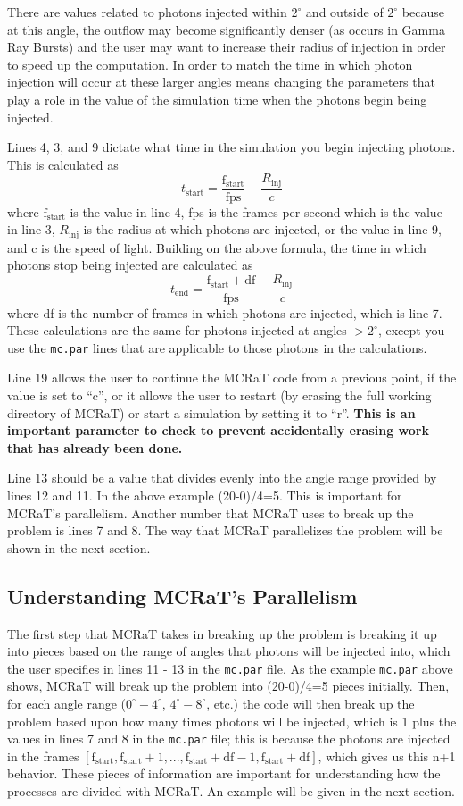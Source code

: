 \documentclass[12pt,a4paper]{article}
\begin{document}
There are values related to photons injected within $2^\circ$ and outside of $2^\circ$ because at this angle, the outflow may become significantly denser (as occurs in Gamma Ray Bursts) and the user may want to increase their radius of injection in order to speed up the computation. In order to match the time in which photon injection will occur at these larger angles means changing the parameters that play a role in the value of the simulation time when the photons begin being injected. 

Lines 4, 3, and  9 dictate what time in the simulation you begin injecting photons. This is calculated as 
\[
t_\mathrm{start}=\frac{\mathrm{f_{start}}}{\mathrm{fps}}-\frac{R_\mathrm{inj}}{c}
\]
where $\mathrm{f_{start}}$ is the value in line 4, fps is the frames per second which is the value in line 3, $R_\mathrm{inj}$ is the radius at which photons are injected, or the value in line 9, and c is the speed of light. Building on the above formula, the time in which photons stop being injected are calculated as
\[
t_\mathrm{end}=\frac{\mathrm{f_{start}}+\mathrm{df}}{\mathrm{fps}}-\frac{R_\mathrm{inj}}{c}
\]
where df is the number of frames in which photons are injected, which is line 7. These calculations are the same for photons injected at angles $> 2^\circ$, except you use the \texttt{mc.par} lines that are applicable to those photons in the calculations. 

Line 19 allows the user to continue the MCRaT code from a previous point, if the value is set to ``c'', or it allows the user to restart (by erasing the full working directory of MCRaT) or start a simulation by setting it to ``r''. {\bf This is an important parameter to check to prevent accidentally erasing work that has already been done.}

Line 13 should be a value that divides evenly into the angle range provided by lines 12 and 11. In the above example (20-0)/4=5. This is important for MCRaT's parallelism. Another number that MCRaT uses to break up the problem is lines 7 and 8. The way that MCRaT parallelizes the problem will be shown in the next section.

\subsection{Understanding MCRaT's Parallelism}
The first step that MCRaT takes in breaking up the problem is breaking it up into pieces based on the range of angles that photons will be injected into, which the user specifies in lines 11 - 13 in the \texttt{mc.par} file. As the example \texttt{mc.par} above shows, MCRaT will break up the problem into (20-0)/4=5 pieces initially. Then, for each angle range ($0^\circ-4^\circ$, $4^\circ-8^\circ$, etc.) the code will then break up the problem based upon how many times photons will be injected, which is 1 plus the values in lines 7 and 8 in the \texttt{mc.par} file; this is because the photons are injected in the frames $[\mathrm{f_{start}}, \mathrm{f_{start}}+1, ..., \mathrm{f_{start}}+\mathrm{df}-1, \mathrm{f_{start}}+\mathrm{df}]$, which gives us this n+1 behavior. These pieces of information are important for understanding how the processes are divided with MCRaT. An example will be given in the next section.
\end{document}
